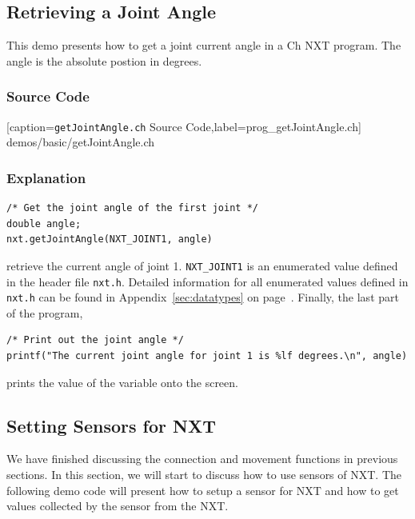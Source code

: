 \documentclass[11pt]{article}
\begin{document}
\subsection{Retrieving a Joint Angle}
This demo presents how to get a joint current angle in a Ch NXT program. The angle is the absolute postion in degrees.

\subsubsection*{Source Code}

[caption={{\tt getJointAngle.ch} Source Code},label=prog_getJointAngle.ch]
{demos/basic/getJointAngle.ch}

\subsubsection*{Explanation}

\begin{lstlisting}
/* Get the joint angle of the first joint */
double angle;
nxt.getJointAngle(NXT_JOINT1, angle)
\end{lstlisting}
retrieve the current angle of joint 1. {\tt NXT\_JOINT1} is an enumerated 
value defined in the header file {\tt nxt.h}. Detailed information for all 
enumerated values defined in {\tt nxt.h} can be found in 
Appendix~\ref{sec:datatypes} on page~\pageref{sec:datatypes}. Finally, the 
last part of the program,
\begin{lstlisting}
/* Print out the joint angle */
printf("The current joint angle for joint 1 is %lf degrees.\n", angle)
\end{lstlisting}
prints the value of the variable onto the screen.

\subsection{\label{setSensor_demo}Setting Sensors for NXT}
We have finished discussing the connection and movement functions in previous 
sections. In this section, we will start to discuss how to use sensors of NXT. 
The following demo code will present how to setup a sensor for NXT and how to 
get values collected by the sensor from the NXT.
\end{document}
